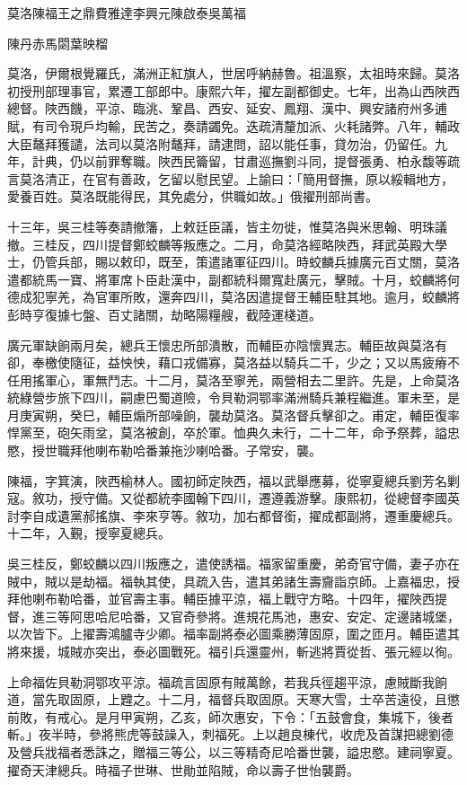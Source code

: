 
\begin{pinyinscope}
莫洛陳福王之鼎費雅達李興元陳啟泰吳萬福

陳丹赤馬閟葉映榴

莫洛，伊爾根覺羅氏，滿洲正紅旗人，世居呼納赫魯。祖溫察，太祖時來歸。莫洛初授刑部理事官，累遷工部郎中。康熙六年，擢左副都御史。七年，出為山西陜西總督。陜西饑，平涼、臨洮、鞏昌、西安、延安、鳳翔、漢中、興安諸府州多逋賦，有司令現戶均輸，民苦之，奏請蠲免。迭疏清釐加派、火耗諸弊。八年，輔政大臣鼇拜獲譴，法司以莫洛附鼇拜，請逮問，詔以能任事，貸勿治，仍留任。九年，計典，仍以前罪奪職。陜西民籥留，甘肅巡撫劉斗同，提督張勇、柏永馥等疏言莫洛清正，在官有善政，乞留以慰民望。上諭曰：「簡用督撫，原以綏輯地方，愛養百姓。莫洛既能得民，其免處分，供職如故。」俄擢刑部尚書。

十三年，吳三桂等奏請撤籓，上敕廷臣議，皆主勿徙，惟莫洛與米思翰、明珠議撤。三桂反，四川提督鄭蛟麟等叛應之。二月，命莫洛經略陜西，拜武英殿大學士，仍管兵部，賜以敕印，既至，策遣諸軍征四川。時蛟麟兵據廣元百丈關，莫洛遣都統馬一寶、將軍席卜臣赴漢中，副都統科爾寬赴廣元，擊賊。十月，蛟麟將何德成犯寧羌，為官軍所敗，還奔四川，莫洛因遣提督王輔臣駐其地。逾月，蛟麟將彭時亨復據七盤、百丈諸關，劫略陽糧艘，截陸運棧道。

廣元軍缺餉兩月矣，總兵王懷忠所部潰散，而輔臣亦陰懷異志。輔臣故與莫洛有卻，奉檄使隨征，益怏怏，藉口戎備寡，莫洛益以騎兵二千，少之；又以馬疲瘠不任用搖軍心，軍無鬥志。十二月，莫洛至寧羌，兩營相去二里許。先是，上命莫洛統綠營步旅下四川，嗣慮巴蜀道險，令貝勒洞鄂率滿洲騎兵兼程繼進。軍未至，是月庚寅朔，癸巳，輔臣煽所部噪餉，襲劫莫洛。莫洛督兵擊卻之。甫定，輔臣復率悍黨至，砲矢雨坌，莫洛被創，卒於軍。恤典久未行，二十二年，命予祭葬，謚忠愍，授世職拜他喇布勒哈番兼拖沙喇哈番。子常安，襲。

陳福，字箕演，陜西榆林人。國初師定陜西，福以武舉應募，從寧夏總兵劉芳名剿寇。敘功，授守備。又從都統李國翰下四川，遷遵義游擊。康熙初，從總督李國英討李自成遺黨郝搖旗、李來亨等。敘功，加右都督銜，擢成都副將，遷重慶總兵。十二年，入覲，授寧夏總兵。

吳三桂反，鄭蛟麟以四川叛應之，遣使誘福。福家留重慶，弟奇官守備，妻子亦在賊中，賊以是劫福。福執其使，具疏入告，遣其弟諸生壽齎詣京師。上嘉福忠，授拜他喇布勒哈番，並官壽主事。輔臣據平涼，福上戰守方略。十四年，擢陜西提督，進三等阿思哈尼哈番，又官奇參將。進規花馬池，惠安、安定、定邊諸城堡，以次皆下。上擢壽鴻臚寺少卿。福率副將泰必圖乘勝薄固原，圍之匝月。輔臣遣其將來援，城賊亦突出，泰必圖戰死。福引兵還靈州，斬逃將賈從哲、張元經以徇。

上命福佐貝勒洞鄂攻平涼。福疏言固原有賊萬餘，若我兵徑趨平涼，慮賊斷我餉道，當先取固原，上韙之。十二月，福督兵取固原。天寒大雪，士卒苦遠役，且懲前敗，有戒心。是月甲寅朔，乙亥，師次惠安，下令：「五鼓會食，集城下，後者斬。」夜半時，參將熊虎等鼓譟入，刺福死。上以趙良棟代，收虎及首謀把總劉德及營兵戕福者悉誅之，贈福三等公，以三等精奇尼哈番世襲，謚忠愍。建祠寧夏。擢奇天津總兵。時福子世琳、世勛並陷賊，命以壽子世怡襲爵。


\end{pinyinscope}
